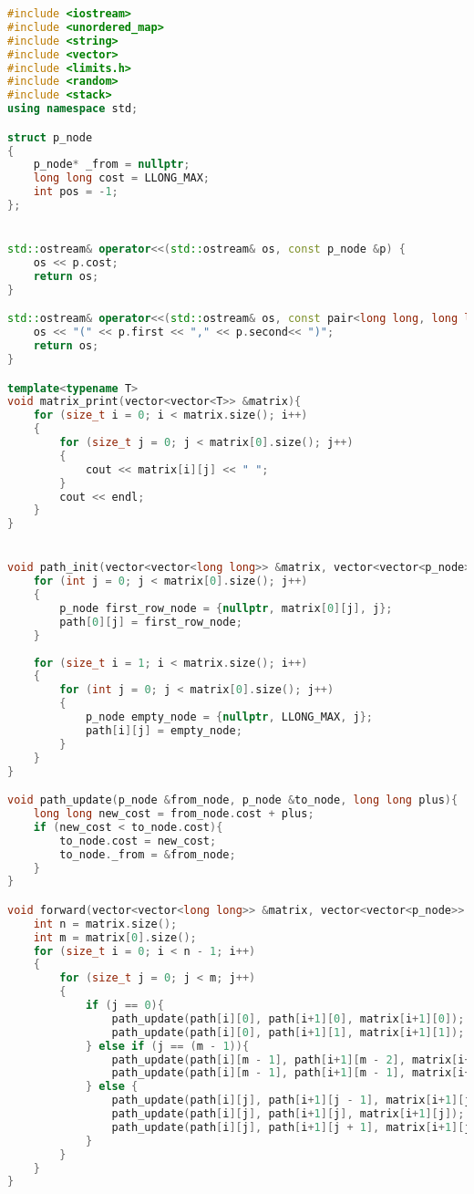 \begin{lstlisting}[language=C++]
#include <iostream>
#include <unordered_map>
#include <string>
#include <vector>
#include <limits.h>
#include <random>
#include <stack>
using namespace std;

struct p_node
{
    p_node* _from = nullptr;
    long long cost = LLONG_MAX;
    int pos = -1;
};


std::ostream& operator<<(std::ostream& os, const p_node &p) {
    os << p.cost;
    return os;
}

std::ostream& operator<<(std::ostream& os, const pair<long long, long long> &p) {
    os << "(" << p.first << "," << p.second<< ")";
    return os;
}

template<typename T>
void matrix_print(vector<vector<T>> &matrix){
    for (size_t i = 0; i < matrix.size(); i++)
    {
        for (size_t j = 0; j < matrix[0].size(); j++)
        {
            cout << matrix[i][j] << " ";
        }
        cout << endl;
    }
}


void path_init(vector<vector<long long>> &matrix, vector<vector<p_node>> &path){
    for (int j = 0; j < matrix[0].size(); j++)
    {
        p_node first_row_node = {nullptr, matrix[0][j], j};
        path[0][j] = first_row_node;
    }
    
    for (size_t i = 1; i < matrix.size(); i++)
    {
        for (int j = 0; j < matrix[0].size(); j++)
        {
            p_node empty_node = {nullptr, LLONG_MAX, j};
            path[i][j] = empty_node;
        }
    }
}

void path_update(p_node &from_node, p_node &to_node, long long plus){
    long long new_cost = from_node.cost + plus;
    if (new_cost < to_node.cost){
        to_node.cost = new_cost;
        to_node._from = &from_node;
    }
}

void forward(vector<vector<long long>> &matrix, vector<vector<p_node>> &path){
    int n = matrix.size();
    int m = matrix[0].size();
    for (size_t i = 0; i < n - 1; i++)
    {
        for (size_t j = 0; j < m; j++)
        {
            if (j == 0){
                path_update(path[i][0], path[i+1][0], matrix[i+1][0]);
                path_update(path[i][0], path[i+1][1], matrix[i+1][1]);
            } else if (j == (m - 1)){
                path_update(path[i][m - 1], path[i+1][m - 2], matrix[i+1][m - 2]);
                path_update(path[i][m - 1], path[i+1][m - 1], matrix[i+1][m - 1]);
            } else {
                path_update(path[i][j], path[i+1][j - 1], matrix[i+1][j - 1]);
                path_update(path[i][j], path[i+1][j], matrix[i+1][j]);
                path_update(path[i][j], path[i+1][j + 1], matrix[i+1][j + 1]);
            }
        }
    }
}


\end{lstlisting}
